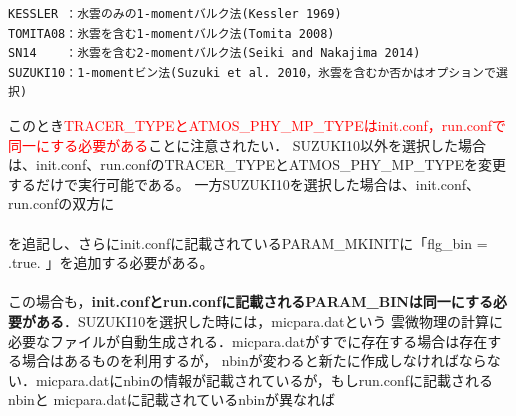 \begin{verbatim}
KESSLER ：水雲のみの1-momentバルク法(Kessler 1969)
TOMITA08：氷雲を含む1-momentバルク法(Tomita 2008)
SN14    ：氷雲を含む2-momentバルク法(Seiki and Nakajima 2014)
SUZUKI10：1-momentビン法(Suzuki et al. 2010，氷雲を含むか否かはオプションで選択)
\end{verbatim}

このとき\textcolor{red}{TRACER\_TYPEとATMOS\_PHY\_MP\_TYPEはinit.conf，run.confで同一にする必要がある}ことに注意されたい．
SUZUKI10以外を選択した場合は、init.conf、run.confのTRACER\_TYPEとATMOS\_PHY\_MP\_TYPEを変更するだけで実行可能である。
一方SUZUKI10を選択した場合は、init.conf、run.confの双方に\\

{\small {\gt
{}}}\\

を追記し、さらにinit.confに記載されているPARAM\_MKINITに「flg\_bin = .true. 」を追加する必要がある。\\

{\small {\gt
{}}}\\

この場合も，{\bf init.confとrun.confに記載されるPARAM\_BINは同一にする必要がある}．SUZUKI10を選択した時には，micpara.datという
雲微物理の計算に必要なファイルが自動生成される．micpara.datがすでに存在する場合は存在する場合はあるものを利用するが，
nbinが変わると新たに作成しなければならない．micpara.datにnbinの情報が記載されているが，もしrun.confに記載されるnbinと
micpara.datに記載されているnbinが異なれば

\\

